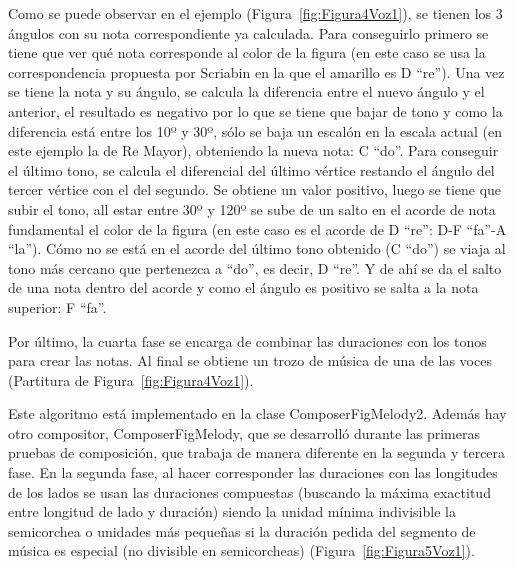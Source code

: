 Como se puede observar en el ejemplo (Figura~\ref{fig:Figura4Voz1}), se tienen los 3 ángulos con su nota correspondiente ya calculada. Para conseguirlo primero se tiene que ver qué nota corresponde al color de la figura (en este caso se usa la correspondencia propuesta por Scriabin en la que el amarillo es D ``re''). Una vez se tiene la nota y su ángulo, se calcula la diferencia entre el nuevo ángulo y el anterior, el resultado es negativo por lo que se tiene que bajar de tono y como la diferencia está entre los 10º y 30º, sólo se baja un escalón en la escala actual (en este ejemplo la de Re Mayor), obteniendo la nueva nota: C ``do''. Para conseguir el último tono, se calcula el diferencial del último vértice restando el ángulo del tercer vértice con el del segundo. Se obtiene un valor positivo, luego se tiene que subir el tono, all estar entre 30º y 120º se sube de un salto en el acorde de nota fundamental el color de la figura (en este caso es el acorde de D ``re'': D-F ``fa''-A ``la''). Cómo no se está en el acorde del último tono obtenido (C ``do'') se viaja al tono más cercano que pertenezca a ``do'', es decir, D ``re''. Y de ahí se da el salto de una nota dentro del acorde y como el ángulo es positivo se salta a la nota superior: F ``fa''.

Por último, la cuarta fase se encarga de combinar las duraciones con los tonos para crear las notas. Al final se obtiene un trozo de música de una de las voces (Partitura de Figura~\ref{fig:Figura4Voz1}).

Este algoritmo está implementado en la clase ComposerFigMelody2. Además hay otro compositor, ComposerFigMelody, que se desarrolló durante las primeras pruebas de composición, que trabaja de manera diferente en la segunda y tercera fase. En la segunda fase, al hacer corresponder las duraciones con las longitudes de los lados se usan las duraciones compuestas (buscando la máxima exactitud entre longitud de lado y duración) siendo la unidad mínima indivisible la semicorchea o unidades más pequeñas si la duración pedida del segmento de música es especial (no divisible en semicorcheas) (Figura~\ref{fig:Figura5Voz1}).

